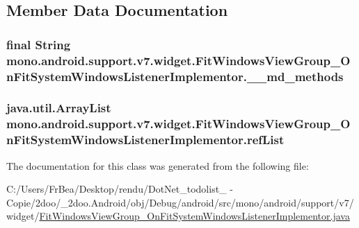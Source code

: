 \subsection{Member Data Documentation}
\hypertarget{classmono_1_1android_1_1support_1_1v7_1_1widget_1_1_fit_windows_view_group___on_fit_system_windows_listener_implementor_4bfebff3c5afa405dc21820881b44472}{
\subsubsection[{\_\-\_\-md\_\-methods}]{\setlength{\rightskip}{0pt plus 5cm}final String {\bf mono.android.support.v7.widget.FitWindowsViewGroup\_\-OnFitSystemWindowsListenerImplementor.\_\-\_\-md\_\-methods}}}
\label{classmono_1_1android_1_1support_1_1v7_1_1widget_1_1_fit_windows_view_group___on_fit_system_windows_listener_implementor_4bfebff3c5afa405dc21820881b44472}


\hypertarget{classmono_1_1android_1_1support_1_1v7_1_1widget_1_1_fit_windows_view_group___on_fit_system_windows_listener_implementor_18103d9bee4928836967deb4f490da6c}{
\subsubsection[{refList}]{\setlength{\rightskip}{0pt plus 5cm}java.util.ArrayList {\bf mono.android.support.v7.widget.FitWindowsViewGroup\_\-OnFitSystemWindowsListenerImplementor.refList}}}
\label{classmono_1_1android_1_1support_1_1v7_1_1widget_1_1_fit_windows_view_group___on_fit_system_windows_listener_implementor_18103d9bee4928836967deb4f490da6c}




The documentation for this class was generated from the following file:\begin{CompactItemize}
\item 
C:/Users/FrBea/Desktop/rendu/DotNet\_\-todolist\_ - Copie/2doo/\_\-2doo.Android/obj/Debug/android/src/mono/android/support/v7/widget/\hyperlink{_fit_windows_view_group___on_fit_system_windows_listener_implementor_8java}{FitWindowsViewGroup\_\-OnFitSystemWindowsListenerImplementor.java}\end{CompactItemize}
